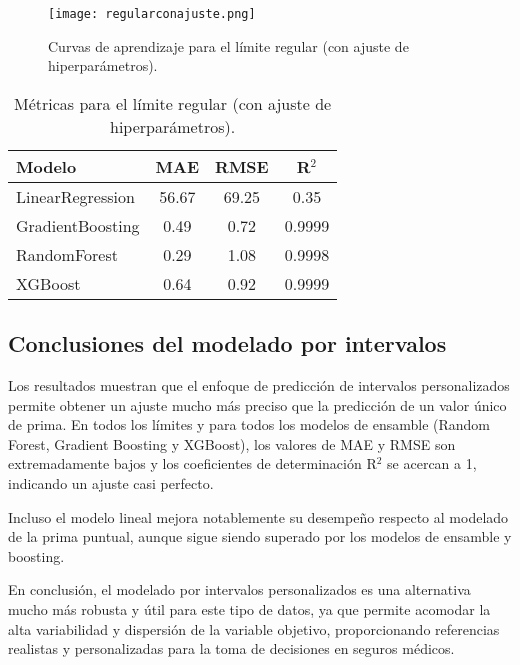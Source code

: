 \documentclass[12pt,a4paper]{article}
\begin{document}
\begin{itemize}
\begin{figure}[H]
    \centering
    \texttt{[image: regularconajuste.png]}
    \caption{Curvas de aprendizaje para el límite regular (con ajuste de hiperparámetros).}
\end{figure}
\begin{table}[H]
\centering
\begin{tabular}{lccc}
\toprule
\textbf{Modelo} & \textbf{MAE} & \textbf{RMSE} & \textbf{R$^2$} \\
\midrule
LinearRegression & 56.67 & 69.25 & 0.35 \\
GradientBoosting & 0.49 & 0.72 & 0.9999 \\
RandomForest & 0.29 & 1.08 & 0.9998 \\
XGBoost & 0.64 & 0.92 & 0.9999 \\
\bottomrule
\end{tabular}
\caption{Métricas para el límite regular (con ajuste de hiperparámetros).}
\end{table}

\subsection*{Conclusiones del modelado por intervalos}
Los resultados muestran que el enfoque de predicción de intervalos personalizados permite obtener un ajuste mucho más preciso que la predicción de un valor único de prima. En todos los límites y para todos los modelos de ensamble (Random Forest, Gradient Boosting y XGBoost), los valores de MAE y RMSE son extremadamente bajos y los coeficientes de determinación R$^2$ se acercan a 1, indicando un ajuste casi perfecto.

Incluso el modelo lineal mejora notablemente su desempeño respecto al modelado de la prima puntual, aunque sigue siendo superado por los modelos de ensamble y boosting.

En conclusión, el modelado por intervalos personalizados es una alternativa mucho más robusta y útil para este tipo de datos, ya que permite acomodar la alta variabilidad y dispersión de la variable objetivo, proporcionando referencias realistas y personalizadas para la toma de decisiones en seguros médicos.




























\end{itemize}
\end{document}
